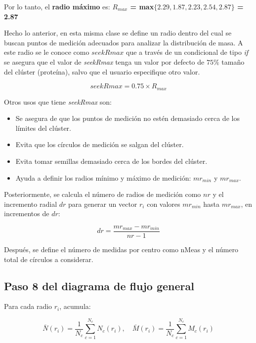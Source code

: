  	Por lo tanto, el \textbf{radio máximo} 
 	es: \textbf{$R_{max}$ = max$\{2.29, 1.87, 2.23, 2.54, 2.87\}$ = 2.87}
 	
 	Hecho lo anterior, en esta misma clase se define un radio dentro del cual se buscan puntos
 	 de medición adecuados para analizar la distribución de masa. A este radio se le conoce
 	  como $seekRmax$ que a través de un condicional de tipo \textit{if} se asegura que el valor 
 	  de \textit{seekRmax} tenga un valor por defecto de $75\%$ tamaño del clúster (proteína), 
 	  salvo que el usuario especifique otro valor.
 	
 	\begin{equation}
 		 	seekRmax = 0.75 \times R_{max} 
 	\end{equation}
 	
 	Otros usos que tiene \textit{seekRmax} son:
 	
 	\begin{itemize}
 		\item Se asegura de que los puntos de medición no estén demasiado cerca de los límites del clúster.
 		\item Evita que los círculos de medición se salgan del clúster.
 		\item Evita tomar semillas demasiado cerca de los bordes del clúster.
 		\item Ayuda a definir los radios mínimo y máximo de medición: $mr_{min}$ y $mr_{max}$.
 	\end{itemize}
 
 	Posteriormente, se calcula el número de radios de medición como $nr$ y el incremento radial $dr$ 
 	para  generar un vector $r_i$ con valores $mr_{min}$ hasta $mr_{max}$, en incrementos de $dr$:
 
 	\begin{equation}
 		 	dr = \frac{mr_{max} - mr_{min}}{nr - 1}
 	\end{equation}
	
	 Después, se define el n\'{u}mero de medidas por centro como nMeas y el n\'{u}mero total 
	 de c\'{i}rculos a considerar.
	 	
	\subsection{Paso 8 del diagrama de flujo general}
 
	Para cada radio $r_i$, acumula:
	
	\begin{equation}
			\bar{N}(r_i) = \frac{1}{N_c} \sum_{c=1}^{N_c} N_c(r_i), \quad
		\bar{M}(r_i) = \frac{1}{N_c} \sum_{c=1}^{N_c} M_c(r_i)
	\end{equation}


